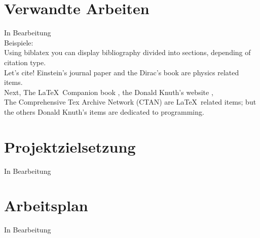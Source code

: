 \documentclass[12pt,a4paper, oneside]{scrartcl}
\begin{document}
\section{Verwandte Arbeiten}
	In Bearbeitung \\
	Beispiele: \\
	Using biblatex you can display bibliography divided into sections, 
	depending of citation type. \\ 
	Let's cite! Einstein's journal paper \cite{einstein} and the Dirac's 
	book \cite{dirac} are physics related items.  \\
	Next, The \LaTeX\ Companion book \cite{einstein}, the Donald 
	Knuth's website \cite{knuthwebsite}, \\
	{The Comprehensive Tex Archive 
	Network} (CTAN) \cite{dirac} are \LaTeX\ related items; but the others Donald 
	Knuth's items \cite{knuth-fa} are dedicated to programming. 






\newpage




\section{Projektzielsetzung}
	In Bearbeitung 
	






\newpage




\section{Arbeitsplan}
	In Bearbeitung





\newpage





\end{document}
